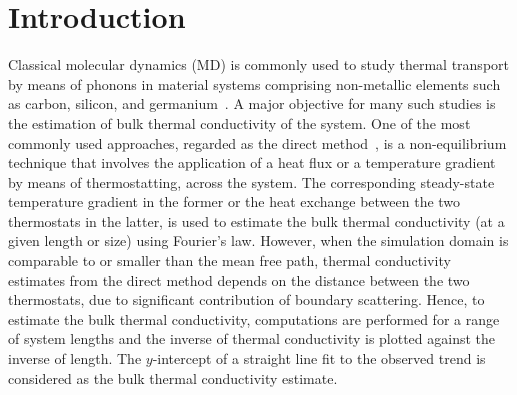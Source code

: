\section{Introduction}
\label{sec:intro}

\begin{comment}
1. Background on use of MD simulations for thermal transport, preferred for studying
thermal transport by phononic interactions (refer notes from book suggested by Amuthan)


2. One approach to NEMD is the Direct Method, commonly used for estimating the bulk
thermal conductivity. A brief discussion on the direct method and associated pros and cons
(notes from Dellan's paper and book suggested by Amuthan) 
Predictions impacted by the choice of potential, values of
individual parameters, size, and potentially due to duration and applied thermal gradients
(cite Amuthan book, Francesco's paper, McGaughey's paper). 
Errors are introduced by thermostatting (Amuthan book). Nominal value of SW potential parameters
based on fitting against experiments and to ensure structural stability etc. (SW paper)

3. Motivate uncertainty analysis and briefly discuss and cite recent efforts (Francesco, Kirby,
Murthy). Highlight focus and key contributions of the present work and how it differs from
those efforts. 

4. Section-wise overview of the paper.  
\end{comment}

Classical molecular dynamics (MD) is commonly used to study thermal transport by means of
phonons in material systems comprising non-metallic elements such
as carbon, silicon, and germanium~\cite{Dumitrica:2010}. 
A major objective for many such studies is the
estimation of bulk thermal conductivity of the system. One of the most commonly used approaches,
regarded as the direct method~\cite{Schelling:2002,Turney:2009,Zhou:2009,Landry:2009,
McGaughey:2006,Ni:2009,Shi:2009,Wang:2009,Papanikolaou:2008}, is a non-equilibrium
technique that involves the application
of a heat flux or a temperature gradient by means of thermostatting, across the system. 
The corresponding steady-state temperature gradient in the former or the heat exchange between
the two thermostats in the latter, is used to estimate the bulk thermal conductivity (at a given
length or size) using 
Fourier's law. However, when the simulation domain is comparable to or smaller than the
mean free path, thermal conductivity estimates from the direct method depends on the
distance between the two thermostats, due to significant contribution of boundary scattering.
Hence, to estimate the bulk thermal conductivity, computations are performed for a range of
system lengths and the inverse
of thermal conductivity is plotted against the inverse of length. The $y$-intercept of a
straight line fit to the observed trend is considered as the bulk thermal conductivity 
estimate. 

